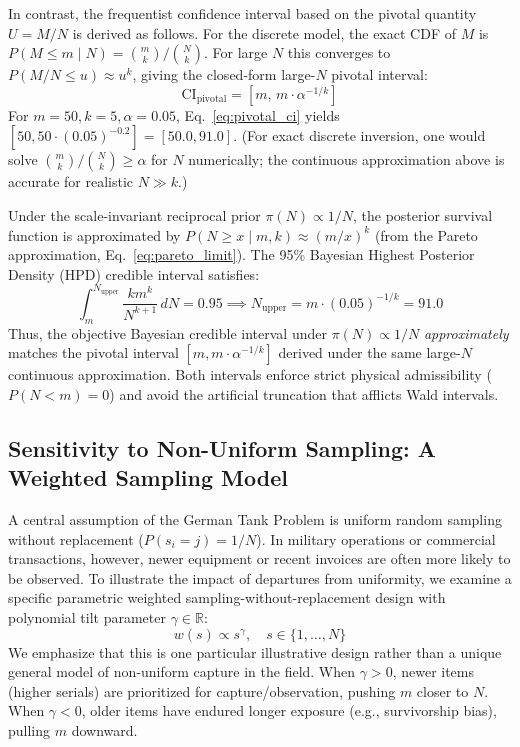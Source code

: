 \documentclass[10pt,a4paper]{article}
\begin{document}
In contrast, the frequentist confidence interval based on the pivotal quantity $U = M/N$ is derived as follows. For the discrete model, the exact CDF of $M$ is $P(M \le m \mid N) = \binom{m}{k}/\binom{N}{k}$. For large $N$ this converges to $P(M/N \le u) \approx u^k$, giving the closed-form large-$N$ pivotal interval:
\begin{equation}
\text{CI}_{\text{pivotal}} = \left[ m, \, m \cdot \alpha^{-1/k} \right]
\label{eq:pivotal_ci}
\end{equation}
For $m = 50, k = 5, \alpha = 0.05$, Eq.~\eqref{eq:pivotal_ci} yields $[50, 50 \cdot (0.05)^{-0.2}] = [50.0, 91.0]$. (For exact discrete inversion, one would solve $\binom{m}{k}/\binom{N}{k} \ge \alpha$ for $N$ numerically; the continuous approximation above is accurate for realistic $N \gg k$.)

Under the scale-invariant reciprocal prior $\pi(N) \propto 1/N$, the posterior survival function is approximated by $P(N \ge x \mid m, k) \approx (m/x)^k$ (from the Pareto approximation, Eq.~\eqref{eq:pareto_limit}). The 95\% Bayesian Highest Posterior Density (HPD) credible interval satisfies:
\begin{equation}
\int_m^{N_{\text{upper}}} \frac{k m^k}{N^{k+1}} \, dN = 0.95 \implies N_{\text{upper}} = m \cdot (0.05)^{-1/k} = 91.0
\end{equation}
Thus, the objective Bayesian credible interval under $\pi(N) \propto 1/N$ \emph{approximately} matches the pivotal interval $[m, m \cdot \alpha^{-1/k}]$ derived under the same large-$N$ continuous approximation. Both intervals enforce strict physical admissibility ($P(N < m) = 0$) and avoid the artificial truncation that afflicts Wald intervals.

\subsection{Sensitivity to Non-Uniform Sampling: A Weighted Sampling Model}
A central assumption of the German Tank Problem is uniform random sampling without replacement ($P(s_i = j) = 1/N$). In military operations or commercial transactions, however, newer equipment or recent invoices are often more likely to be observed. To illustrate the impact of departures from uniformity, we examine a specific parametric weighted sampling-without-replacement design with polynomial tilt parameter $\gamma \in \mathbb{R}$:
\begin{equation}
w(s) \propto s^\gamma, \quad s \in \{1, \dots, N\}
\label{eq:sampling_tilt}
\end{equation}
We emphasize that this is one particular illustrative design rather than a unique general model of non-uniform capture in the field. When $\gamma > 0$, newer items (higher serials) are prioritized for capture/observation, pushing $m$ closer to $N$. When $\gamma < 0$, older items have endured longer exposure (e.g., survivorship bias), pulling $m$ downward.
\end{document}
